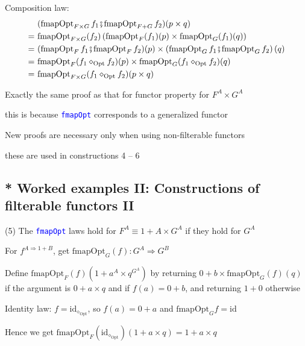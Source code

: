 Composition law:{\footnotesize{}
\begin{align*}
 & (\text{fmapOpt}_{F\times G}\,f_{1}\bef\text{fmapOpt}_{F+G}\,f_{2})(p\times q)\\
=\  & \text{fmapOpt}_{F\times G}(f_{2})\left(\text{fmapOpt}_{F}(f_{1})(p)\times\text{fmapOpt}_{G}(f_{1})(q)\right)\\
=\  & (\text{fmapOpt}_{F}\,f_{1}\bef\text{fmapOpt}_{F}\,f_{2})(p)\times\left(\text{fmapOpt}_{G}\,f_{1}\bef\text{fmapOpt}_{G}\,f_{2}\right)(q)\\
=\  & \text{fmapOpt}_{F}(f_{1}\diamond_{\text{Opt}}f_{2})(p)\times\text{fmapOpt}_{G}(f_{1}\diamond_{\text{Opt}}f_{2})(q)\\
=\  & \text{fmapOpt}_{F\times G}(f_{1}\diamond_{\text{Opt}}f_{2})(p\times q)
\end{align*}
}{\footnotesize\par}

Exactly the same proof as that for functor property for $F^{A}\times G^{A}$

this is because \texttt{\textcolor{blue}{\footnotesize{}fmapOpt}}
corresponds to a generalized functor

New proofs are necessary only when using non-filterable functors

these are used in constructions 4 – 6


\subsection{{*} Worked examples II: Constructions of filterable functors II}

(5) The \texttt{\textcolor{blue}{\footnotesize{}fmapOpt}} laws hold
for $F^{A}\equiv1+A\times G^{A}$ if they hold for $G^{A}$

For $f^{A\Rightarrow1+B}$, get {\footnotesize{}$\text{fmapOpt}_{G}(f):G^{A}\Rightarrow G^{B}$}{\footnotesize\par}

{\footnotesize{}Define $\text{fmapOpt}_{F}(f)(1+a^{A}\times q^{G^{A}})$
by returning $0+b\times\text{fmapOpt}_{G}(f)(q)$ if the argument
is $0+a\times q$ and if $f(a)=0+b$, and returning $1+0$ otherwise}{\footnotesize\par}

Identity law: {\footnotesize{}$f=\text{id}_{\diamond_{\text{Opt}}}$,
so $f(a)=0+a$ and $\text{fmapOpt}_{G}f=\text{id}$}{\footnotesize\par}

Hence we get{\footnotesize{} $\text{fmapOpt}_{F}(\text{id}_{\diamond_{\text{Opt}}})(1+a\times q)=1+a\times q$}{\footnotesize\par}

